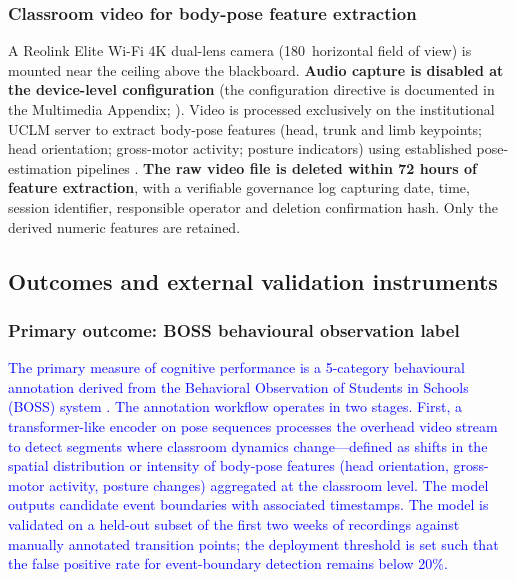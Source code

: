 \subsubsection{Classroom video for body-pose feature extraction}

A Reolink Elite Wi-Fi 4K dual-lens camera (180\textdegree\ horizontal field of view) is mounted near the ceiling above the blackboard. \textbf{Audio capture is disabled at the device-level configuration} (the configuration directive is documented in the Multimedia Appendix; ). Video is processed exclusively on the institutional UCLM server to extract body-pose features (head, trunk and limb keypoints; head orientation; gross-motor activity; posture indicators) using established pose-estimation pipelines \parencite{Cao2021_openpose,Lugaresi2019_mediapipe,Sun2019_hrnet,Jocher2023_yolov8}. \textbf{The raw video file is deleted within 72 hours of feature extraction}, with a verifiable governance log capturing date, time, session identifier, responsible operator and deletion confirmation hash. Only the derived numeric features are retained.

\subsection{Outcomes and external validation instruments}\label{subsec:outcomes}

\subsubsection{Primary outcome: BOSS behavioural observation label}

\textcolor{blue}{The primary measure of cognitive performance is a 5-category behavioural annotation derived from the Behavioral Observation of Students in Schools (BOSS) system \parencite{Shapiro2011_boss,Volpe2023_classroom_observation_review,Alperin2023_boss_validation}. The annotation workflow operates in two stages. First, a transformer-like encoder on pose sequences processes the overhead video stream to detect segments where classroom dynamics change---defined as shifts in the spatial distribution or intensity of body-pose features (head orientation, gross-motor activity, posture changes) aggregated at the classroom level. The model outputs candidate event boundaries with associated timestamps. The model is validated on a held-out subset of the first two weeks of recordings against manually annotated transition points; the deployment threshold is set such that the false positive rate for event-boundary detection remains below 20\%.}

